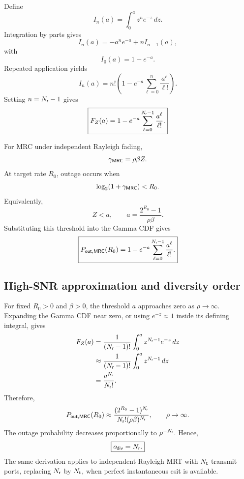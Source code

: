 Define
\begin{equation*}
	I_n(a)=\int_0^a z^ne^{-z}\,dz.
\end{equation*}
Integration by parts gives
\begin{equation*}
	I_n(a)
	=-a^ne^{-a}+nI_{n-1}(a),
\end{equation*}
with
\begin{equation*}
	I_0(a)=1-e^{-a}.
\end{equation*}
Repeated application yields
\begin{equation*}
	I_n(a)
	=n!\left(
	1-e^{-a}\sum_{\ell=0}^{n}
	\frac{a^\ell}{\ell!}
	\right).
\end{equation*}
Setting $n=N_{\mathsf{r}}-1$ gives
\begin{equation}\label{eq:app-gamma-cdf}
	\boxed{
		F_Z(a)
		=1-e^{-a}
		\sum_{\ell=0}^{N_{\mathsf{r}}-1}\frac{a^\ell}{\ell!}.
	}
\end{equation}

For MRC under independent Rayleigh fading,
\begin{equation*}
	\gamma_{\mathsf{MRC}}
	=\rho\beta Z.
\end{equation*}
At target rate $R_0$, outage occurs when
\begin{equation*}
	\log_2(1+\gamma_{\mathsf{MRC}})<R_0.
\end{equation*}
Equivalently,
\begin{equation*}
	Z<a,\qquad
	a=\frac{2^{R_0}-1}{\rho\beta}.
\end{equation*}
Substituting this threshold into the Gamma CDF gives
\begin{equation}\label{eq:app-mrc-outage}
	\boxed{
		P_{\mathsf{out},\mathsf{MRC}}(R_0)
		=1-e^{-a}
		\sum_{\ell=0}^{N_{\mathsf{r}}-1}\frac{a^\ell}{\ell!}.
	}
\end{equation}

\subsection{High-SNR approximation and diversity order}

For fixed $R_0>0$ and $\beta>0$, the threshold $a$ approaches zero as $\rho\to\infty$. Expanding the Gamma CDF near zero, or using $e^{-z}\approx1$ inside its defining integral, gives
\begin{align*}
	F_Z(a)
	&=\frac{1}{(N_{\mathsf{r}}-1)!}
	\int_0^a z^{N_{\mathsf{r}}-1}e^{-z}\,dz\\
	&\approx
	\frac{1}{(N_{\mathsf{r}}-1)!}
	\int_0^a z^{N_{\mathsf{r}}-1}\,dz\\
	&=\frac{a^{N_{\mathsf{r}}}}{N_{\mathsf{r}}!}.
\end{align*}
Therefore,
\begin{equation*}
	P_{\mathsf{out},\mathsf{MRC}}(R_0)
	\approx
	\frac{(2^{R_0}-1)^{N_{\mathsf{r}}}}
	{N_{\mathsf{r}}!(\rho\beta)^{N_{\mathsf{r}}}},
	\qquad \rho\to\infty.
\end{equation*}
The outage probability decreases proportionally to $\rho^{-N_{\mathsf{r}}}$. Hence,
\begin{equation*}
	\boxed{o_{\mathsf{div}}=N_{\mathsf{r}}.}
\end{equation*}
The same derivation applies to independent Rayleigh MRT with $N_{\mathsf{t}}$ transmit ports, replacing $N_{\mathsf{r}}$ by $N_{\mathsf{t}}$, when perfect instantaneous \ac{csit} is available.



